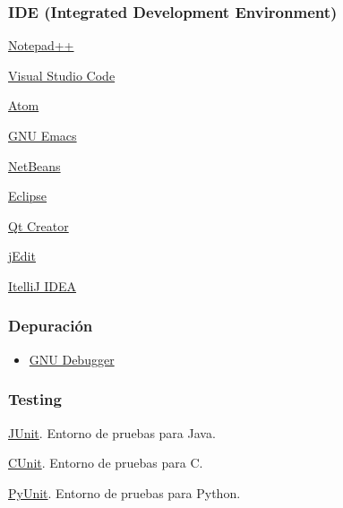 \subsubsection{IDE (Integrated Development Environment)}
\begin{multicols}{2}
\begin{compactitem}
\item \href{https://notepad-plus-plus.org/}{Notepad++}
\item \href{https://code.visualstudio.com/}{Visual Studio Code}
\item \href{https://atom.io/}{Atom}
\item \href{https://www.gnu.org/s/emacs/}{GNU Emacs}
\item \href{https://netbeans.org/}{NetBeans}
\item \href{https://eclipse.org/}{Eclipse}
\item \href{https://www.qt.io/ide/}{Qt Creator}
\item \href{http://www.jedit.org/}{jEdit}
\item \href{https://www.jetbrains.com/idea/}{ItelliJ IDEA}
\end{compactitem}
\end{multicols}



\subsubsection{Depuración}
\begin{itemize}
\item \href{https://www.gnu.org/s/gdb/}{GNU Debugger}
\end{itemize}


\subsubsection{Testing}
\begin{multicols}{2}
\begin{compactitem}
\item \href{http://junit.org}{JUnit}. Entorno de pruebas para Java.
\item \href{http://cunit.sourceforge.net/}{CUnit}. Entorno de pruebas para C.
\item \href{https://wiki.python.org/moin/PyUnit}{PyUnit}. Entorno de pruebas para Python.
\end{compactitem}
\end{multicols}

